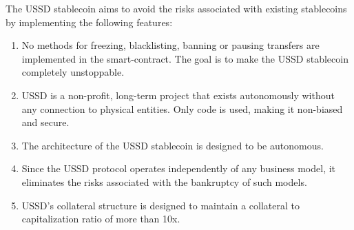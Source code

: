 The USSD stablecoin aims to avoid the risks associated with existing stablecoins 
by implementing the following features:
\begin{enumerate}
  \item No methods for freezing, blacklisting, banning or pausing transfers are 
  implemented in the smart-contract. The goal is to make the USSD stablecoin completely unstoppable.
  \item USSD is a non-profit, long-term project that exists autonomously without any 
  connection to physical entities. Only code is used, making it non-biased and secure.
  \item The architecture of the USSD stablecoin is designed to be autonomous.
  \item Since the USSD protocol operates independently of any business model, it 
  eliminates the risks associated with the bankruptcy of such models.
  \item USSD's collateral structure is designed to maintain a collateral to capitalization 
  ratio of more than 10x.
\end{enumerate}

